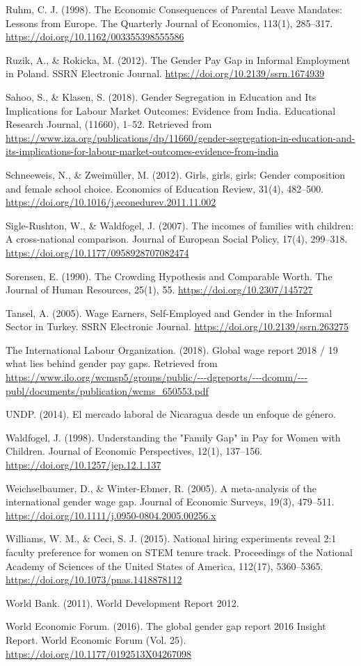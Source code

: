 Ruhm, C. J. (1998). The Economic Consequences of Parental Leave Mandates: Lessons from Europe. The Quarterly Journal of Economics, 113(1), 285–317. \url{https://doi.org/10.1162/003355398555586}

Ruzik, A., \& Rokicka, M. (2012). The Gender Pay Gap in Informal Employment in Poland. SSRN Electronic Journal. \url{https://doi.org/10.2139/ssrn.1674939}

Sahoo, S., \& Klasen, S. (2018). Gender Segregation in Education and Its Implications for Labour Market Outcomes: Evidence from India. Educational Research Journal, (11660), 1–52. Retrieved from \url{https://www.iza.org/publications/dp/11660/gender-segregation-in-education-and-its-implications-for-labour-market-outcomes-evidence-from-india}

Schneeweis, N., \& Zweimüller, M. (2012). Girls, girls, girls: Gender composition and female school choice. Economics of Education Review, 31(4), 482–500. \url{https://doi.org/10.1016/j.econedurev.2011.11.002}

Sigle-Rushton, W., \& Waldfogel, J. (2007). The incomes of families with children: A cross-national comparison. Journal of European Social Policy, 17(4), 299–318. \url{https://doi.org/10.1177/0958928707082474}

Sorensen, E. (1990). The Crowding Hypothesis and Comparable Worth. The Journal of Human Resources, 25(1), 55. \url{https://doi.org/10.2307/145727}

Tansel, A. (2005). Wage Earners, Self-Employed and Gender in the Informal Sector in Turkey. SSRN Electronic Journal. \url{https://doi.org/10.2139/ssrn.263275}

The International Labour Organization. (2018). Global wage report 2018 / 19 what lies behind gender pay gaps. Retrieved from \url{https://www.ilo.org/wcmsp5/groups/public/---dgreports/---dcomm/---publ/documents/publication/wcms\_650553.pdf}

UNDP. (2014). El mercado laboral de Nicaragua desde un enfoque de género.

Waldfogel, J. (1998). Understanding the "Family Gap" in Pay for Women with Children. Journal of Economic Perspectives, 12(1), 137–156. \url{https://doi.org/10.1257/jep.12.1.137}

Weichselbaumer, D., \& Winter-Ebmer, R. (2005). A meta-analysis of the international gender wage gap. Journal of Economic Surveys, 19(3), 479–511. \url{https://doi.org/10.1111/j.0950-0804.2005.00256.x}

Williams, W. M., \& Ceci, S. J. (2015). National hiring experiments reveal 2:1 faculty preference for women on STEM tenure track. Proceedings of the National Academy of Sciences of the United States of America, 112(17), 5360–5365. \url{https://doi.org/10.1073/pnas.1418878112}

World Bank. (2011). World Development Report 2012.

World Economic Forum. (2016). The global gender gap report 2016 Insight Report. World Economic Forum (Vol. 25). \url{https://doi.org/10.1177/0192513X04267098}

\endgroup